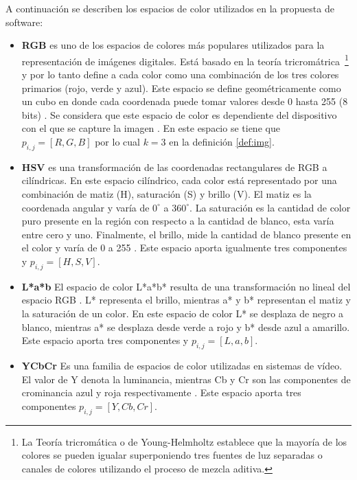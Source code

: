 A continuación se describen los espacios de color utilizados en la propuesta de software:

\begin{itemize}
	\item \textbf{RGB} es uno de los espacios de colores más populares utilizados para la representación de imágenes digitales. Está basado en la teoría tricromátrica~\footnote{La Teoría tricromática o de Young-Helmholtz establece que la mayoría de los colores se pueden igualar superponiendo tres fuentes de luz separadas o canales de colores utilizando el proceso de mezcla aditiva.} y por lo tanto define a cada color como una combinación de los tres colores primarios (rojo, verde y azul). Este espacio se define geométricamente como un cubo en donde cada coordenada puede tomar valores desde 0 hasta 255 (8 bits) \cite{sangwine1998colour}. Se considera que este espacio de color es dependiente del dispositivo con el que se capture la imagen \cite{tkalcic2003colour, ruela2013role}. En este espacio se tiene que $p_{i, j} = [R, G, B]$ por lo cual $k=3$ en la definición \ref{def:img}.
	
	\item \textbf{HSV} es una transformación de las coordenadas rectangulares de RGB a cilíndricas. En este espacio cilíndrico, cada color está representado por una combinación de matiz (H), saturación (S) y brillo (V). El matiz es la coordenada angular y varía de $0^{\circ}$ a $360^{\circ}$. La saturación es la cantidad de color puro presente en la región con respecto a la cantidad de blanco, esta varía entre cero y uno. Finalmente, el brillo, mide la cantidad de blanco presente en el color y varía de 0 a 255 \cite{ruela2013role}. Este espacio aporta igualmente tres componentes y $p_{i, j} = [H, S, V]$.
	
	\item \textbf{L*a*b} El espacio de color L*a*b* resulta de una transformación no lineal del espacio RGB \cite{bradski2000opencv}. L* representa el brillo, mientras a* y b* representan el matiz y la saturación de un color. En este espacio de color L* se desplaza de negro a blanco, mientras a* se desplaza desde verde a rojo y b* desde azul a amarillo. Este espacio aporta tres componentes y $p_{i, j} = [L, a, b]$.
	
	\item \textbf{YCbCr} Es una familia de espacios de color utilizadas en sistemas de vídeo. El valor de Y denota la luminancia, mientras Cb y Cr son las componentes de crominancia azul y roja respectivamente \cite{sergyan2007color}. Este espacio aporta tres componentes $p_{i, j} = [Y, Cb, Cr]$.
\end{itemize}

